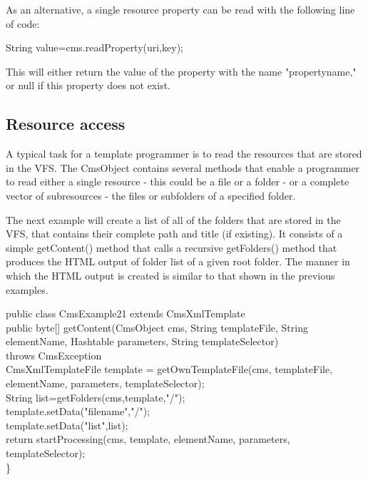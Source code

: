 As an alternative, a single resource property can be read with the
following line of code:

{\code String value=cms.readProperty(uri,key);}

This will either return the value of the property with the name
"propertyname," or null if this property does not exist.

\subsection{Resource access}

A typical task for a template programmer is to read the resources that
are stored in the VFS. The {\name CmsObject} contains several methods that
enable a programmer to read either a single resource - this could be a
file or a folder - or a complete vector of subresources - the files or
subfolders of a specified folder.

The next example will create a list of all of the folders that are
stored in the VFS, that contains their complete path and
title (if existing). It consists of a simple {\meth getContent()} method that calls a
recursive {\meth getFolders()} method that produces the HTML output of folder
list of a given root folder. The manner in which the HTML output is
created is similar to that shown in the previous examples.

\begin{java}
public class CmsExample21 extends CmsXmlTemplate\\ 
public byte[] getContent(CmsObject cms, String templateFile, String\\
elementName, Hashtable parameters, String templateSelector)\\
throws CmsException\\ 
CmsXmlTemplateFile template = getOwnTemplateFile(cms, templateFile,\\
elementName, parameters, templateSelector);\\
\jtabc        String list=getFolders(cms,template,"/");\\
\jtabc        template.setData("filename","/");\\
\jtabc        template.setData("list",list);\\

return startProcessing(cms, template, elementName, parameters,\\
templateSelector);\\
\}\\
\end{java}

